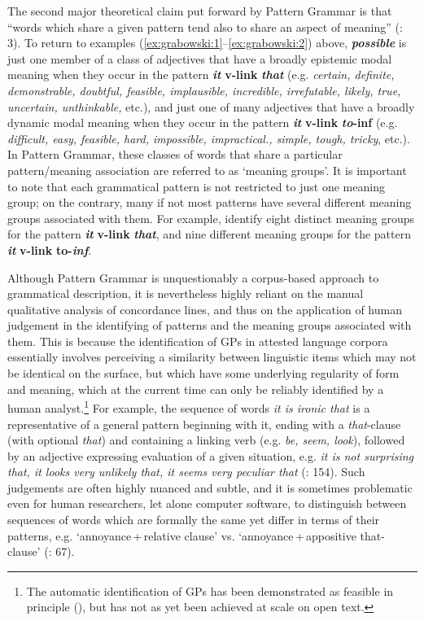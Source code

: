 \documentclass[output=paper]{langscibook}
\begin{document}
The second major theoretical claim put forward by Pattern Grammar is that “words which share a given pattern tend also to share an aspect of meaning” (\citealt{HunstonFrancis2000}: 3). To return to examples (\ref{ex:grabowski:1}--\ref{ex:grabowski:2}) above, \textbf{\textit{possible}} is just one member of a class of adjectives that have a broadly epistemic modal meaning when they occur in the pattern \textbf{\textit{it}} \textbf{v-link} \textbf{{\ADJ}} \textbf{\textit{that}} (e.g. \textit{certain, definite, demonstrable, doubtful, feasible, implausible, incredible, irrefutable, likely, true, uncertain, unthinkable,} etc.), and just one of many adjectives that have a broadly dynamic modal meaning when they occur in the pattern \textbf{\textit{it}} \textbf{v-link} \textbf{{\ADJ}} \textbf{\textit{to}}\textbf{{}-inf} (e.g. \textit{difficult, easy, feasible, hard, impossible, impractical., simple, tough, tricky}, etc.). In Pattern Grammar, these classes of words that share a particular pattern/meaning association are referred to as ‘meaning groups’. It is important to note that each grammatical pattern is not restricted to just one meaning group; on the contrary, many if not most patterns have several different meaning groups associated with them. For example, \citet{FrancisEtAl1998} identify eight distinct meaning groups for the pattern \textbf{\textit{it}} \textbf{v-link} \textbf{{\ADJ}} \textbf{\textit{that}}, and nine different meaning groups for the pattern \textbf{\textit{it}} \textbf{v-link} \textbf{{\ADJ}} \textbf{to-\textit{inf}}.

Although Pattern Grammar is unquestionably a corpus-based approach to grammatical description, it is nevertheless highly reliant on the manual qualitative analysis of concordance lines, and thus on the application of human judgement in the identifying of patterns and the meaning groups associated with them. This is because the identification of GPs in attested language corpora essentially involves perceiving a similarity between linguistic items which may not be identical on the surface, but which have some underlying regularity of form and meaning, which at the current time can only be reliably identified by a human analyst.\footnote{The automatic identification of GPs has been demonstrated as feasible in principle (\citealt{MasonHunston2004}), but has not as yet been achieved at scale on open text.} For example, the sequence of words \textit{it is ironic that} is a representative of a general pattern beginning with it, ending with a \textit{that}{}-clause (with optional \textit{that}) and containing a linking verb (e.g. \textit{be, seem, look}), followed by an adjective expressing evaluation of a given situation, e.g. \textit{it is not surprising that, it looks very unlikely that, it seems very peculiar that} (\citealt{HunstonFrancis2000}: 154). Such judgements are often highly nuanced and subtle, and it is sometimes problematic even for human researchers, let alone computer software, to distinguish between sequences of words which are formally the same yet differ in terms of their patterns, e.g. ‘annoyance\,+\,relative clause’ vs. ‘annoyance\,+\,appositive that-clause’ (\citealt{HunstonFrancis2000}: 67). 
\end{document}
